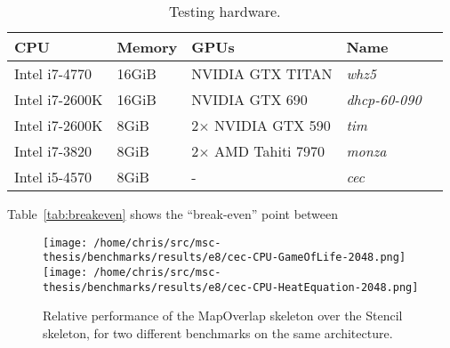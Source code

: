 \begin{table}
\footnotesize
\centering
\begin{tabular}{| l | l | l | l | l |}
\hline
\textbf{CPU} & \textbf{Memory} & \textbf{GPUs} & \textbf{Name}\\
\hline
Intel i7-4770 & 16GiB & NVIDIA GTX TITAN & \textit{whz5}\\
Intel i7-2600K & 16GiB & NVIDIA GTX 690 & \textit{dhcp-60-090}\\
Intel i7-2600K & 8GiB & 2$\times$ NVIDIA GTX 590 & \textit{tim}\\
Intel i7-3820 & 8GiB & 2$\times$ AMD Tahiti 7970 & \textit{monza}\\
Intel i5-4570 & 8GiB & - & \textit{cec}\\
\hline
\end{tabular}
\caption{%
  Testing hardware.%
}
\label{tab:hw}
\end{table}

Table~\ref{tab:breakeven} shows the ``break-even'' point between

\begin{table}
\footnotesize
\centering

\caption{%
  Relative performance of MapOverlap vs Stencil skeletons for over an
  increasing number of iterations. The ``Break-even point'' is the number of
  iterations at which point the Stencil kernel is faster than MapOverlap.%
}
\label{tab:breakeven}
\end{table}

\begin{figure}
\texttt{[image: /home/chris/src/msc-thesis/benchmarks/results/e8/cec-CPU-GameOfLife-2048.png]}
\texttt{[image: /home/chris/src/msc-thesis/benchmarks/results/e8/cec-CPU-HeatEquation-2048.png]}
\caption{%
  Relative performance of the MapOverlap skeleton over the Stencil
  skeleton, for two different benchmarks on the same architecture.%
}
\end{figure}

